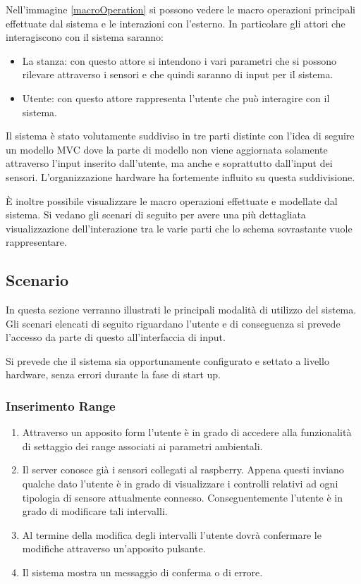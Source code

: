 Nell'immagine \ref{macroOperation} si possono vedere le macro operazioni principali effettuate dal sistema e le interazioni con l'esterno. In particolare gli attori che interagiscono con il sistema saranno:

\begin{itemize}
  \item La stanza: con questo attore si intendono i vari parametri che si possono rilevare attraverso i sensori e che quindi saranno di input per il sistema.
  \item Utente: con questo attore rappresenta l'utente che pu\`o interagire con il sistema.
\end{itemize}

Il sistema \`e stato volutamente suddiviso in tre parti distinte con l'idea di seguire un modello MVC dove la parte di modello non viene aggiornata solamente attraverso l'input inserito dall'utente, ma anche e soprattutto dall'input dei sensori. L'organizzazione hardware ha fortemente influito su questa suddivisione.

\`E inoltre possibile visualizzare le macro operazioni effettuate e modellate dal sistema. Si vedano gli scenari di seguito per avere una pi\`u dettagliata visualizzazione dell'interazione tra le varie parti che lo schema sovrastante vuole rappresentare.

\subsection{Scenario}

In questa sezione verranno illustrati le principali modalit\`a di utilizzo del sistema. Gli scenari elencati di seguito riguardano l'utente e di conseguenza si prevede l'accesso da parte di questo all'interfaccia di input.

Si prevede che il sistema sia opportunamente configurato e settato a livello hardware, senza errori durante la fase di start up.

\subsubsection{Inserimento Range}

\begin{enumerate}
  \item Attraverso un apposito form l'utente \`e in grado di accedere alla funzionalit\`a di settaggio dei range associati ai parametri ambientali.
  \item Il server conosce gi\`a i sensori collegati al raspberry. Appena questi inviano qualche dato l'utente \`e in grado di visualizzare i controlli relativi ad ogni tipologia di sensore attualmente connesso. Conseguentemente l'utente \`e in grado di modificare tali intervalli.
  \item Al termine della modifica degli intervalli l'utente dovr\`a confermare le modifiche attraverso un'apposito pulsante.
  \item Il sistema mostra un messaggio di conferma o di errore.
\end{enumerate}

